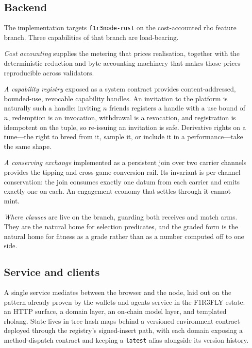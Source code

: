 \documentclass[11pt,a4paper]{article}
\theoremstyle{definition}
\theoremstyle{plain}
\begin{document}
\subsection{Backend}

The implementation targets \texttt{f1r3node-rust} on the cost-accounted rho feature branch. Three
capabilities of that branch are load-bearing.

\emph{Cost accounting} supplies the metering that prices realisation, together with the deterministic
reduction and byte-accounting machinery that makes those prices reproducible across validators.

\emph{A capability registry} exposed as a system contract provides content-addressed, bounded-use,
revocable capability handles. An invitation to the platform is naturally such a handle: inviting
$n$ friends registers a handle with a use bound of $n$, redemption is an invocation, withdrawal is a
revocation, and registration is idempotent on the tuple, so re-issuing an invitation is safe.
Derivative rights on a tune---the right to breed from it, sample it, or include it in a
performance---take the same shape.

\emph{A conserving exchange} implemented as a persistent join over two carrier channels provides the
tipping and cross-game conversion rail. Its invariant is per-channel conservation: the join consumes
exactly one datum from each carrier and emits exactly one on each. An engagement economy that
settles through it cannot mint.

\emph{Where clauses} are live on the branch, guarding both receives and match arms. They are the
natural home for selection predicates, and the graded form is the natural home for fitness as a
grade rather than as a number computed off to one side.

\subsection{Service and clients}

A single service mediates between the browser and the node, laid out on the pattern already proven
by the wallets-and-agents service in the F1R3FLY estate: an HTTP surface, a domain layer, an
on-chain model layer, and templated rholang. State lives in tree hash maps behind a versioned
environment contract deployed through the registry's signed-insert path, with each domain exposing
a method-dispatch contract and keeping a \texttt{latest} alias alongside its version history.
\end{document}
